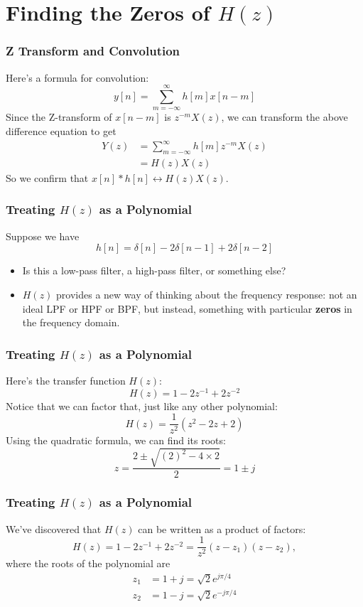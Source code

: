 \documentclass{beamer}
\begin{document}
\section[Zeros]{Finding the Zeros of $H(z)$}
\setcounter{subsection}{1}

\begin{frame}
  \frametitle{Z Transform and Convolution}
  
  Here's a formula for convolution:
  \[
  y[n] = \sum_{m=-\infty}^\infty h[m]x[n-m]
  \]
  Since the Z-transform of $x[n-m]$ is $z^{-m}X(z)$, we can transform
  the above difference equation to get
  \begin{align*}
  Y(z) &= \sum_{m=-\infty}^\infty h[m]z^{-m}X(z)\\
  &= H(z)X(z)
  \end{align*}
  So we confirm that $x[n]\ast h[n]\leftrightarrow H(z)X(z)$.
\end{frame}

\begin{frame}
  \frametitle{Treating $H(z)$ as a Polynomial}

  Suppose we have
  \[
  h[n] = \delta[n]-2\delta[n-1] + 2\delta[n-2]
  \]
  \begin{itemize}
  \item Is this a low-pass filter, a high-pass
    filter, or something else?
  \item $H(z)$ provides a new way of thinking about the frequency response:
    not an ideal LPF or HPF or BPF, but instead, something with
    particular {\bf zeros} in the frequency domain.
  \end{itemize}
\end{frame}

\begin{frame}
  \frametitle{Treating $H(z)$ as a Polynomial}
  
  Here's the transfer function $H(z)$:
  \[
  H(z) = 1-2z^{-1}+2z^{-2}
  \]
  Notice that we can factor that, just like any other polynomial:
  \[
  H(z) = \frac{1}{z^2}\left(z^2 -2z+2\right)
  \]
  Using the quadratic formula, we can find its roots:
  \[
  z = \frac{2\pm\sqrt{(2)^2-4\times 2}}{2}= 1\pm j
  \]
\end{frame}

\begin{frame}
  \frametitle{Treating $H(z)$ as a Polynomial}
  
  We've discovered that $H(z)$ can be written as a product of factors:
  \[
  H(z) = 1-2z^{-1}+2z^{-2} = \frac{1}{z^2}(z-z_1)(z-z_2),
  \]
  where the roots of the polynomial are
  \begin{align*}
    z_1 &= 1+j =\sqrt{2}e^{j\pi/4}\\
    z_2 &= 1-j = \sqrt{2}e^{-j\pi/4}
  \end{align*}
\end{frame}
\end{document}
